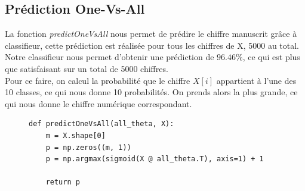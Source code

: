 \subsection{Prédiction One-Vs-All}

La fonction \textit{predictOneVsAll} nous permet de prédire le chiffre manuscrit grâce à classifieur, cette prédiction est réalisée pour tous les chiffres de X, 5000 au total. \\
Notre classifieur nous permet d'obtenir une prédiction de $96.46\%$, ce qui est plus que satisfaisant sur un total de 5000 chiffres.\\


Pour ce faire, on calcul la probabilité que le chiffre $X[i]$ appartient à l'une des 10 classes, ce qui nous donne 10 probabilités. On prends alors la plus grande, ce qui nous donne le chiffre numérique
correspondant.

\begin{figure}[!h]
\begin{verbatim}
def predictOneVsAll(all_theta, X):
    m = X.shape[0]
    p = np.zeros((m, 1))
    p = np.argmax(sigmoid(X @ all_theta.T), axis=1) + 1

    return p
\end{verbatim}   
\end{figure}
